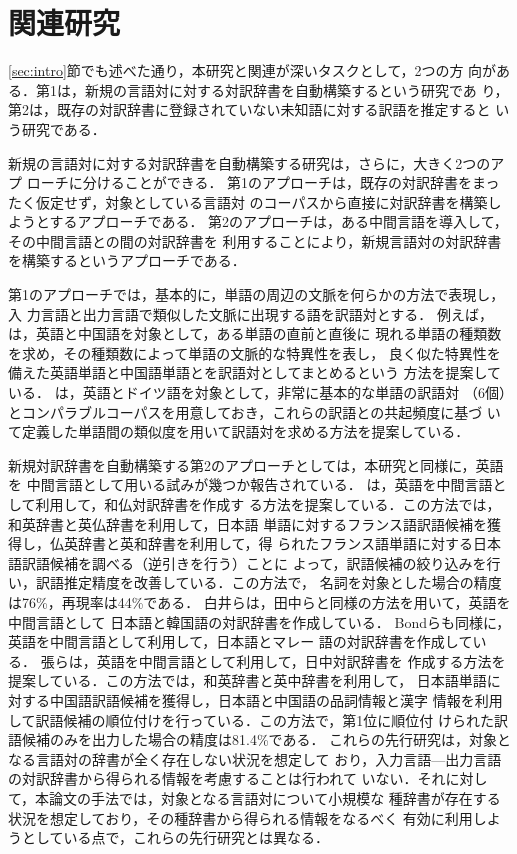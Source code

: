 \documentclass[japanese]{jnlp_1.4}
\begin{document}
\section{関連研究}
\label{sec:related_works}

\ref{sec:intro}節でも述べた通り，本研究と関連が深いタスクとして，2つの方
向がある．第1は，新規の言語対に対する対訳辞書を自動構築するという研究であ
り，第2は，既存の対訳辞書に登録されていない未知語に対する訳語を推定すると
いう研究である．

新規の言語対に対する対訳辞書を自動構築する研究は，さらに，大きく2つのアプ
ローチに分けることができる．
第1のアプローチは，既存の対訳辞書をまったく仮定せず，対象としている言語対
のコーパスから直接に対訳辞書を構築しようとするアプローチである．
第2のアプローチは，ある中間言語を導入して，その中間言語との間の対訳辞書を
利用することにより，新規言語対の対訳辞書を構築するというアプローチである．

第1のアプローチでは，基本的に，単語の周辺の文脈を何らかの方法で表現し，入
力言語と出力言語で類似した文脈に出現する語を訳語対とする．
例えば，\cite{fung95}は，英語と中国語を対象として，ある単語の直前と直後に
現れる単語の種類数を求め，その種類数によって単語の文脈的な特異性を表し，
良く似た特異性を備えた英語単語と中国語単語とを訳語対としてまとめるという
方法を提案している．
\cite{rapp95}は，英語とドイツ語を対象として，非常に基本的な単語の訳語対
（6個）とコンパラブルコーパスを用意しておき，これらの訳語との共起頻度に基づ
いて定義した単語間の類似度を用いて訳語対を求める方法を提案している．

新規対訳辞書を自動構築する第2のアプローチとしては，本研究と同様に，英語を
中間言語として用いる試みが幾つか報告されている．
\cite{日仏対訳辞書}は，英語を中間言語として利用して，和仏対訳辞書を作成す
る方法を提案している．この方法では，和英辞書と英仏辞書を利用して，日本語
単語に対するフランス語訳語候補を獲得し，仏英辞書と英和辞書を利用して，得
られたフランス語単語に対する日本語訳語候補を調べる（逆引きを行う）ことに
よって，訳語候補の絞り込みを行い，訳語推定精度を改善している．この方法で，
名詞を対象とした場合の精度は76\%，再現率は44\%である．
白井ら\cite{shirai01}は，田中らと同様の方法を用いて，英語を中間言語として
日本語と韓国語の対訳辞書を作成している．
Bondら\cite{bond01}も同様に，英語を中間言語として利用して，日本語とマレー
語の対訳辞書を作成している．
張ら\cite{日中対訳辞書}は，英語を中間言語として利用して，日中対訳辞書を
作成する方法を提案している．この方法では，和英辞書と英中辞書を利用して，
日本語単語に対する中国語訳語候補を獲得し，日本語と中国語の品詞情報と漢字
情報を利用して訳語候補の順位付けを行っている．この方法で，第1位に順位付
けられた訳語候補のみを出力した場合の精度は81.4\%である．
これらの先行研究は，対象となる言語対の辞書が全く存在しない状況を想定して
おり，入力言語—出力言語の対訳辞書から得られる情報を考慮することは行われて
いない．それに対して，本論文の手法では，対象となる言語対について小規模な
種辞書が存在する状況を想定しており，その種辞書から得られる情報をなるべく
有効に利用しようとしている点で，これらの先行研究とは異なる．
\end{document}
